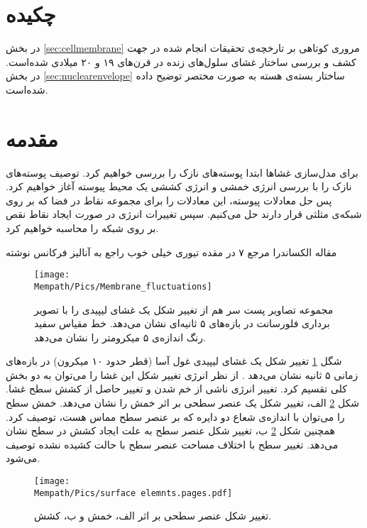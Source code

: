 \setRL
\clearpage
\def \MemModel {\Mempath /MembraneModel}

\section{
چکیده
}
در بخش
\ref{sec:cellmembrane}
مروری کوتاهی بر تارخچه‌ی تحقیقات انجام شده در جهت کشف و بررسی ساختار غشای سلول‌های زنده در قرن‌های ۱۹ و ۲۰ میلادی شده‌است. در بخش
\ref{sec:nuclearenvelope}
ساختار بسته‌ی هسته به صورت مختصر توضیح داده شده‌است.

\section{
مقدمه
}
برای مدل‌سازی غشاها ابتدا پوسته‌های نازک را بررسی خواهیم کرد. توصیف پوسته‌های نازک را با بررسی انرژی خمشی و انرژی کششی یک محیط پیوسته آغاز خواهیم کرد. پس حل معادلات پیوسته، این معادلات را برای مجموعه نقاط در فضا که بر روی شبکه‌ی مثلثی قرار دارند حل می‌کنیم. سپس تغییرات انرژی در صورت ایجاد نقاط نقص بر روی شبکه را محاسبه خواهیم کرد. 


مقاله الکساندرا مرجع ۷ در مقده تيوری خیلی خوب راجع به آنالیز فرکانس نوشته


\begin{figure}[h]
\begin{center}
\texttt{[image: \\Mempath/Pics/Membrane\_fluctuations]}
\caption{
مجموعه تصاویر پست سر هم از تغییر شکل یک غشای لیپیدی را با تصویر برداری فلورسانت در بازه‌های ۵ ثانیه‌ای نشان می‌دهد. خط مقیاس سفید رنگ اندازه‌ی ۵ میکرومتر را نشان می‌دهد. 
\cite{ParthasarathyMembraneMeasurement}
}
\label{fig:flucmem}
\end{center}
\end{figure}

شگل 
\ref{fig:flucmem}
تغییر شکل یک غشای لیپیدی غول آسا (قطر حدود ۱۰ میکرون) در بازه‌های زمانی ۵ ثانیه نشان می‌دهد
\cite{ParthasarathyMembraneMeasurement}
. از نظر انرژی تغییر شکل این غشا را می‌توان به دو بخش کلی تقسیم کرد. تغییر انرژی ناشی از خم شدن و تغییر حاصل از کشش سطح غشا. شکل
\ref{fig:elasticdeformation}
الف، تغییر شکل یک عنصر سطحی بر اثر خمش را نشان می‌دهد. خمش سطح را می‌توان با اندازه‌ی شعاع دو دایره که بر عنصر سطح مماس هست، توصیف کرد. همچنین شکل 
\ref{fig:elasticdeformation}
ب، تغییر شکل عنصر سطح به علت ایجاد کشش در سطح نشان می‌دهد. تغییر سطح با اختلاف مساحت عنصر سطح با حالت کشیده نشده توصیف می‌شود.
\begin{figure}[h]
\begin{center}
\texttt{[image: \\Mempath/Pics/surface elemnts.pages.pdf]}
\caption{
تغییر شکل عنصر سطحی بر اثر الف، خمش و ب، کشش.
}
\label{fig:elasticdeformation}
\end{center}
\end{figure}


